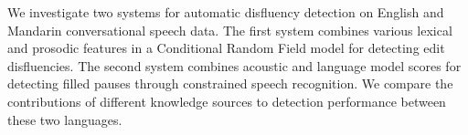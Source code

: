 We investigate two systems for automatic disfluency detection on English and Mandarin conversational speech data. The first system
 combines various lexical and prosodic features in a Conditional Random
 Field model for detecting edit disfluencies. The
 second system combines acoustic and language model scores for
 detecting filled pauses through constrained speech
 recognition. We compare the contributions of different knowledge sources
 to detection performance between these two languages.


